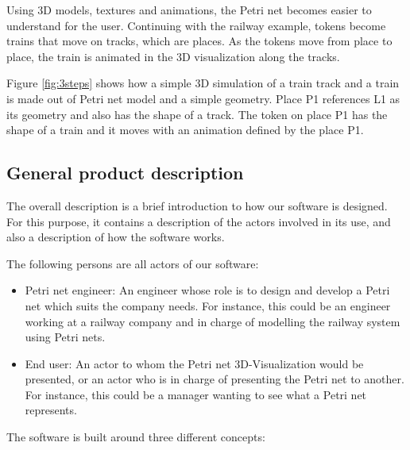 Using 3D models, textures and animations, the Petri net becomes easier to understand for the user. Continuing with the railway example, tokens become trains that move on tracks, which are places. As the tokens move from place to place, the train is animated in the 3D visualization along the tracks.

Figure \ref{fig:3steps}  shows how a simple 3D simulation of a train track and a train is made out of Petri net model and a simple geometry. Place P1 references L1 as its geometry and also has the shape of a track. The token on place P1 has the shape of a train and it moves with an animation defined by the place P1.

\subsection{General product description}

The overall description is a brief introduction to how our software is designed. For this purpose, it contains a description of the actors involved in its use, and also a description of how the software works. \newline

The following persons are all actors of our software:

\begin{itemize}
  \item Petri net engineer: An engineer whose role is to design and develop a Petri net which suits the company needs. \newline
  For instance, this could be an engineer working at a railway company and in charge of modelling the railway system using Petri nets.
  \item End user: An actor to whom the Petri net 3D-Visualization would be presented, or an actor who is in charge of presenting the Petri net to another. \newline
	For instance, this could be a manager wanting to see what a Petri net represents. 
\end{itemize}

The software is built around three different concepts: 

